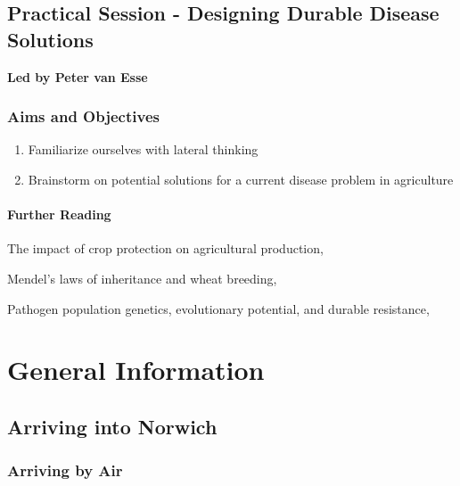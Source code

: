 \documentclass[12pt,]{book}
\providecommand{\tightlist}{%
  \setlength{\itemsep}{0pt}\setlength{\parskip}{0pt}}
\theoremstyle{definition}
\theoremstyle{definition}
\theoremstyle{remark}
\begin{document}
\section*{Practical Session - Designing Durable Disease
Solutions}\label{practical-session---designing-durable-disease-solutions}

\textbf{Led by Peter van Esse}

\subsection*{Aims and Objectives}\label{aims-and-objectives-8}

\begin{enumerate}
\def\labelenumi{\arabic{enumi}.}
\tightlist
\item
  Familiarize ourselves with lateral thinking
\item
  Brainstorm on potential solutions for a current disease problem in
  agriculture
\end{enumerate}

\subsubsection*{Further Reading}\label{further-reading}

The impact of crop protection on agricultural production,
\citet{Popp:102401}

Mendel's laws of inheritance and wheat breeding, \citet{biffen_1905}

Pathogen population genetics, evolutionary potential, and durable
resistance, \citet{McDonald:2002da}

\chapter*{General Information}\label{general-information}

\section*{Arriving into Norwich}\label{arriving-into-norwich}

\subsection*{Arriving by Air}\label{arriving-by-air}
\end{document}
